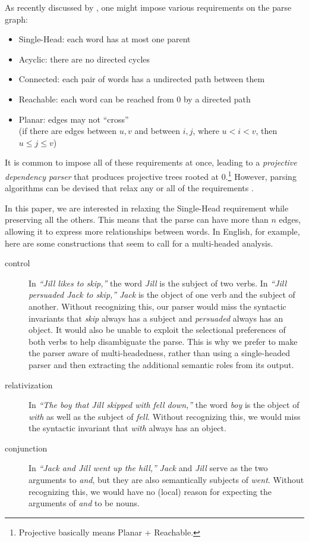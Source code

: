 \documentclass[11pt]{article}
\begin{document}
As recently discussed by , one might impose various requirements on the parse graph:
\begin{itemize}
\item {\sc Single-Head}: each word has at most one parent
\item {\sc Acyclic}: there are no directed cycles
\item {\sc Connected}: each pair of words has a undirected path between them
\item {\sc Reachable}: each word can be reached from 0 by a directed path
\item {\sc Planar}: edges may not ``cross'' \\ (if there are edges between $u,v$ and between $i,j$, where $u < i < v$, then $u \leq j \leq v$)
\end{itemize}
It is common to impose all of these requirements at once, leading to a {\em projective dependency parser} that produces projective trees rooted at 0.\footnote{{\sc Projective} basically means {\sc Planar} + {\sc Reachable}.}  However, parsing algorithms can be devised that relax any or all of the requirements \cite{gomezrodriguez-nivre-2013}.  

In this paper, we are interested in relaxing the {\sc Single-Head} requirement while preserving all the others.  This means that the parse can have more than $n$ edges, allowing it to express more relationships between words.  In English, for example, here are some constructions that seem to call for a multi-headed analysis.  
\begin{description}
\item[control] In {\em ``Jill likes to skip,''} the word {\em Jill} is the subject of two verbs.  In {\em ``Jill persuaded Jack to skip,''} {\em Jack} is the object of one verb and the subject of another.  Without recognizing this, our parser would miss the syntactic invariants that {\em skip} always has a subject and {\em persuaded} always has an object.  It would also be unable to exploit the selectional preferences of both verbs to help disambiguate the parse.  This is why we prefer to make the parser aware of multi-headedness, rather than using a single-headed parser and then extracting the additional semantic roles from its output.
\item[relativization] In {\em ``The boy that Jill skipped with fell down,''} the word {\em boy} is the object of {\em with} as well as the subject of {\em fell}.  Without recognizing this, we would miss the syntactic invariant that {\em with} always has an object.  
\item[conjunction] In {\em ``Jack and Jill went up the hill,''} {\em Jack} and {\em Jill} serve as the two arguments to {\em and}, but they are also semantically subjects of {\em went}.  Without recognizing this, we would have no (local) reason for expecting the arguments of {\em and} to be nouns.
\end{description}
\end{document}
